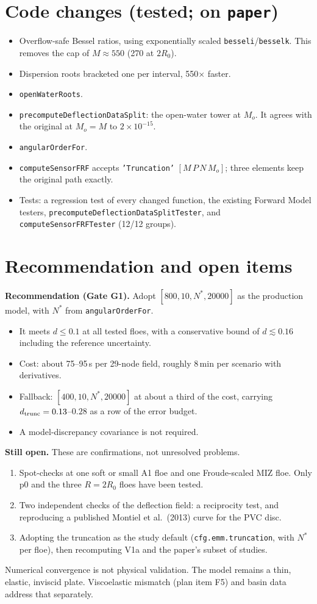 \documentclass[10pt,a4paper]{article}
\begin{document}
\section{Code changes (tested; on \texttt{paper})}
\begin{itemize}
\item Overflow-safe Bessel ratios, using exponentially scaled \texttt{besseli}/\texttt{besselk}. This removes the cap of $M\approx550$ (270 at $2R_0$).
\item Dispersion roots bracketed one per interval, 550$\times$ faster.
\item \texttt{openWaterRoots}.
\item \texttt{precomputeDeflectionDataSplit}: the open-water tower at $M_o$. It agrees with the original at $M_o=M$ to $2\times10^{-15}$.
\item \texttt{angularOrderFor}.
\item \texttt{computeSensorFRF} accepts \texttt{'Truncation'} $[M\,P\,N\,M_o]$; three elements keep the original path exactly.
\item Tests: a regression test of every changed function, the existing Forward Model testers, \texttt{precomputeDeflectionDataSplitTester}, and \texttt{computeSensorFRFTester} (12/12 groups).
\end{itemize}

\section{Recommendation and open items}
\textbf{Recommendation (Gate G1).} Adopt $[800,10,N^*,20000]$ as the production model, with $N^*$ from \texttt{angularOrderFor}.
\begin{itemize}
\item It meets $d\le0.1$ at all tested floes, with a conservative bound of $d\lesssim0.16$ including the reference uncertainty.
\item Cost: about 75--95\,s per 29-node field, roughly 8\,min per scenario with derivatives.
\item Fallback: $[400,10,N^*,20000]$ at about a third of the cost, carrying $d_{\rm trunc}=0.13$--$0.28$ as a row of the error budget.
\item A model-discrepancy covariance is not required.
\end{itemize}

\textbf{Still open.} These are confirmations, not unresolved problems.
\begin{enumerate}
\item Spot-checks at one soft or small A1 floe and one Froude-scaled MIZ floe. Only p0 and the three $R=2R_0$ floes have been tested.
\item Two independent checks of the deflection field: a reciprocity test, and reproducing a published Montiel et al.\ (2013) curve for the PVC disc.
\item Adopting the truncation as the study default (\texttt{cfg.emm.truncation}, with $N^*$ per floe), then recomputing V1a and the paper's subset of studies.
\end{enumerate}
Numerical convergence is not physical validation. The model remains a thin, elastic, inviscid plate. Viscoelastic mismatch (plan item F5) and basin data address that separately.
\end{document}
